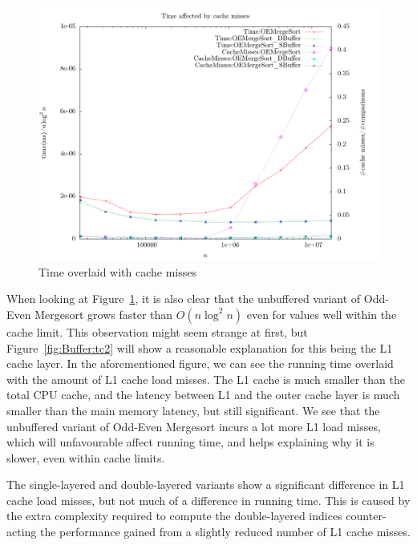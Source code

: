 \begin{figure}
\center
\includegraphics[width=\textwidth]{graphs/Buffer/tc.pdf}
\caption{Time overlaid with cache misses}
\label{fig:Buffer:tc}
\end{figure}


When looking at Figure~\ref{fig:Buffer:tc}, it is also clear that the unbuffered variant of Odd-Even Mergesort grows faster than $O(n \log^2 n)$ even for values well within the cache limit.
This observation might seem strange at first, but Figure~\ref{fig:Buffer:tc2} will show a reasonable explanation for this being the L1 cache layer. In the aforementioned figure, we can see the running time overlaid with the amount of L1 cache load misses. The L1 cache is much smaller than the total CPU cache, and the latency between L1 and the outer cache layer is much smaller than the main memory latency, but still significant. We see that the unbuffered variant of Odd-Even Mergesort incurs  a lot more L1 load misses, which will unfavourable affect running time, and helps explaining why it is slower, even within cache limits.

The single-layered and double-layered variants show a significant difference in L1 cache load misses, but not much of a difference in running time. This is caused by the extra complexity required to compute the double-layered indices counter-acting the performance gained from a slightly reduced number of L1 cache misses.

